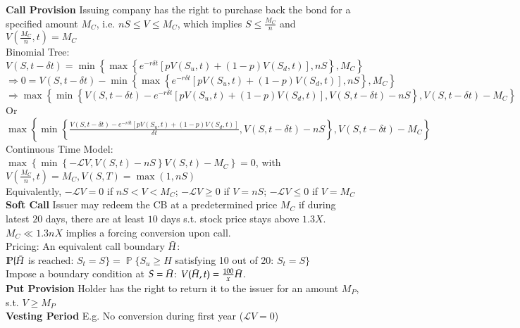 \documentclass[12pt,landscape, a4paper]{article}
\theoremstyle{remark}
\newcommand{\prob}{\operatorname{\mathbb{P}}}
\begin{document}
\begin{multicols*}{3}

\textbf{Call Provision} Issuing company has the right to purchase back the bond for a specified amount $M_C$, i.e. $nS \leq V \leq M_C$, which implies $S \leq \frac{M_C}{n}$ and $V \left(\frac{M_C}{n}, t \right) = M_C$\\
Binomial Tree: $V (S, t - \delta t) = \min \left\{ \max \left\{e^{-r \delta t} \left[p V(S_u, t) + (1-p) V (S_d, t) \right], nS  \right\}, M_C \right\}$\\
$\Rightarrow 0 = V(S, t-\delta t) - \min \left\{ \max \left\{ e^{-r\delta t} \left[pV(S_u, t) + (1-p) V(S_d, t) \right], nS \right\}, M_C  \right\}$\\
$\Rightarrow \max \left\{ \min \left\{ V(S, t-\delta t) - e^{-r\delta t} \left[pV(S_u, t) + (1-p) V(S_d, t) \right], V(S, t-\delta t) - nS \right\}, V(S, t-\delta t)-M_C \right\}$\\
Or $\max \left\{ \min \left\{ \frac{V(S, t-\delta t) - e^{-r\delta t} \left[pV(S_u, t) + (1-p) V(S_d, t) \right]}{\delta t}, V(S, t-\delta t) - nS \right\}, V(S, t-\delta t) - M_C \right\}$
\\
Continuous Time Model: $\max \left\{ \min \left\{ -\mathcal{L} V, V(S, t) - nS \right\}V(S, t) - M_C \right\} = 0$, with $V \left(\frac{M_C}{n}, t \right) = M_C, V (S, T)= \max (1, nS)$\\
Equivalently, $-\mathcal{L} V = 0$ if $nS < V < M_C$; $-\mathcal{L} V \geq 0$ if $V = nS$; $-\mathcal{L} V \leq 0$ if $V = M_C$\\

\textbf{Soft Call} Issuer may redeem the CB at a predetermined price $M_C$ if during latest $20$ days, there are at least $10$ days s.t. stock price stays above $1.3X$. $M_C \ll 1.3nX$ implies a forcing conversion upon call.\\
Pricing: An equivalent call boundary $\Bar{H}$:\\ 
$\prob \{\Bar{H}$ is reached: $S_t = S \} = \prob \{S_u \geq H$ satisfying 10 out of 20: $S_t = S \}$\\
Impose a boundary condition at $S = \Bar{H}$: $V (\Bar{H}, t) = \frac{100}{x} \Bar{H}$.\\
\textbf{Put Provision} Holder has the right to return it to the issuer for an amount $M_P$, s.t. $V \geq M_P$\\
\textbf{Vesting Period} E.g. No conversion during first year ($\mathcal{L} V = 0$)\\


\end{multicols*}
\end{document}
